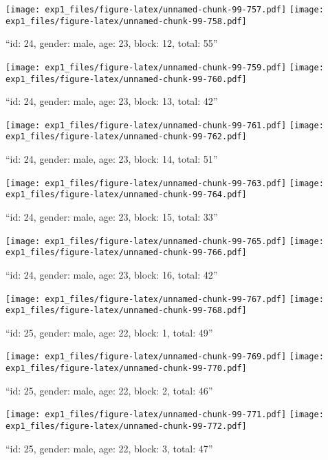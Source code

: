 \documentclass[,]{article}
\begin{document}
\texttt{[image: exp1\_files/figure-latex/unnamed-chunk-99-757.pdf]}
\texttt{[image: exp1\_files/figure-latex/unnamed-chunk-99-758.pdf]}

\newpage
[1] 

``id: 24, gender: male, age: 23, block: 12, total: 55''

\texttt{[image: exp1\_files/figure-latex/unnamed-chunk-99-759.pdf]}
\texttt{[image: exp1\_files/figure-latex/unnamed-chunk-99-760.pdf]}

\newpage
[1] 

``id: 24, gender: male, age: 23, block: 13, total: 42''

\texttt{[image: exp1\_files/figure-latex/unnamed-chunk-99-761.pdf]}
\texttt{[image: exp1\_files/figure-latex/unnamed-chunk-99-762.pdf]}

\newpage
[1] 

``id: 24, gender: male, age: 23, block: 14, total: 51''

\texttt{[image: exp1\_files/figure-latex/unnamed-chunk-99-763.pdf]}
\texttt{[image: exp1\_files/figure-latex/unnamed-chunk-99-764.pdf]}

\newpage
[1] 

``id: 24, gender: male, age: 23, block: 15, total: 33''

\texttt{[image: exp1\_files/figure-latex/unnamed-chunk-99-765.pdf]}
\texttt{[image: exp1\_files/figure-latex/unnamed-chunk-99-766.pdf]}

\newpage
[1] 

``id: 24, gender: male, age: 23, block: 16, total: 42''

\texttt{[image: exp1\_files/figure-latex/unnamed-chunk-99-767.pdf]}
\texttt{[image: exp1\_files/figure-latex/unnamed-chunk-99-768.pdf]}

\newpage
[1] 

``id: 25, gender: male, age: 22, block: 1, total: 49''

\texttt{[image: exp1\_files/figure-latex/unnamed-chunk-99-769.pdf]}
\texttt{[image: exp1\_files/figure-latex/unnamed-chunk-99-770.pdf]}

\newpage
[1] 

``id: 25, gender: male, age: 22, block: 2, total: 46''

\texttt{[image: exp1\_files/figure-latex/unnamed-chunk-99-771.pdf]}
\texttt{[image: exp1\_files/figure-latex/unnamed-chunk-99-772.pdf]}

\newpage
[1] 

``id: 25, gender: male, age: 22, block: 3, total: 47''
\end{document}
